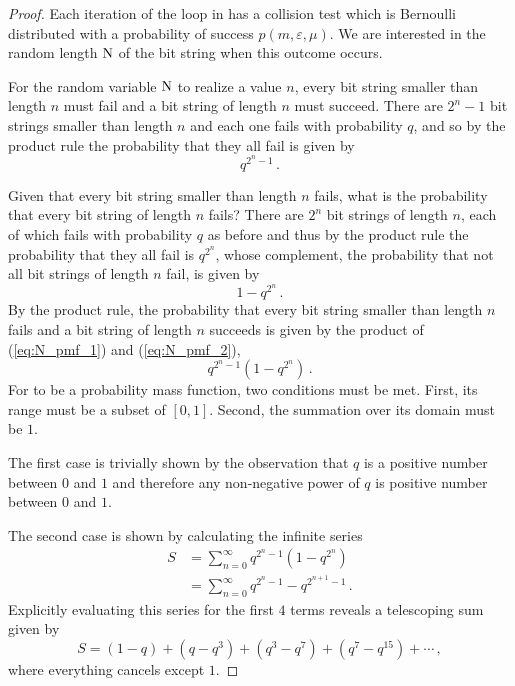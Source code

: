 \documentclass[ ../main.tex]{subfiles}
\begin{document}
\begin{proof}
Each iteration of the loop in  has a collision test which is Bernoulli distributed with a probability of success $p(m,\varepsilon,\mu)$. We are interested in the random length $\mathrm{N}$ of the bit string when this outcome occurs.

For the random variable $\mathrm{N}$ to realize a value $n$, every bit string smaller than length $n$ must fail and a bit string of length $n$ must succeed. There are $2^n-1$ bit strings smaller than length $n$ and each one fails with probability $q$, and so by the product rule the probability that they all fail is given by
\begin{equation}
\label{eq:N_pmf_1}
    q^{2^n - 1}\,.
\end{equation}

Given that every bit string smaller than length $n$ fails, what is the probability that every bit string of length $n$ fails? There are $2^n$ bit strings of length $n$, each of which fails with probability $q$ as before and thus by the product rule the probability that they all fail is $q^{2^n}$, whose complement, the probability that not all bit strings of length $n$ fail, is given by
\begin{equation}
\label{eq:N_pmf_2}
    1 - q^{2^n}\,.
\end{equation}
By the product rule, the probability that every bit string smaller than length $n$ fails and a bit string of length $n$ succeeds is given by the product of (\ref{eq:N_pmf_1}) and (\ref{eq:N_pmf_2}),
\begin{equation}
\label{eq:prob_is_mass}
    q^{2^n-1}\left(1 - q^{2^n}\right)\,.
\end{equation}
For  to be a probability mass function, two conditions must be met. First, its range must be a subset of $[0,1]$. Second, the summation over its domain must be $1$.

The first case is trivially shown by the observation that $q$ is a positive number between $0$ and $1$ and therefore any non-negative power of $q$ is positive number between $0$ and $1$.

The second case is shown by calculating the infinite series
\begin{align}
    S &= \sum_{n=0}^{\infty} q^{2^n-1}\left(1-q^{2^n}\right)\\
      &= \sum_{n=0}^{\infty} q^{2^n-1} - q^{2^{n+1}-1}\,.
\end{align}
Explicitly evaluating this series for the first $4$ terms reveals a telescoping sum given by
\begin{equation}
    S = (1 - q) + (q - q^3) + (q^3 - q^7) + (q^7 - q^{15}) + \cdots\,,
\end{equation}
where everything cancels except $1$.
\end{proof}
\end{document}
